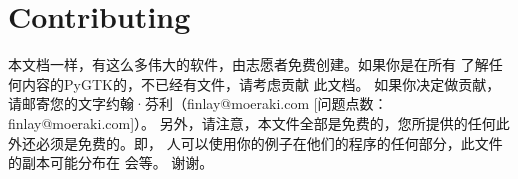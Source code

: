 \chapter{Contributing}
本文档一样，有这么多伟大的软件，由志愿者免费创建​​。如果你是在所有
了解任何内容的PyGTK的，不已经有文件，请考虑贡献
此文档。
如果你决定做贡献，请邮寄您的文字约翰·芬利（finlay@moeraki.com [问题点数：finlay@moeraki.com]）。
另外，请注意，本文件全部是免费的，您所提供的任何此外还必须是免费的。即，
人可以使用你的例子在他们的程序的任何部分，此文件的副本可能分布在
会等。
谢谢。
